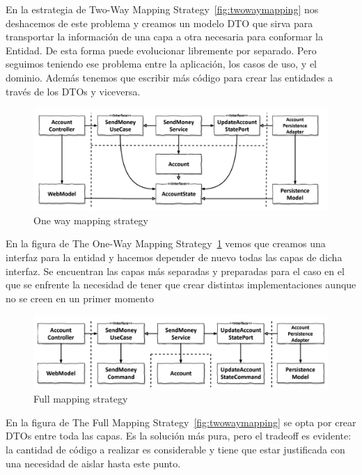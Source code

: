 En la estrategia de Two-Way Mapping Strategy~\cref{fig:twowaymapping} nos deshacemos de este problema y creamos un modelo DTO que sirva para transportar la información de una capa a otra necesaria para conformar la Entidad. De esta forma puede evolucionar libremente por separado. Pero seguimos teniendo ese problema entre la aplicación, los casos de uso, y el dominio. Además tenemos que escribir más código para crear las entidades a través de los DTOs y viceversa.

\begin{figure}[H]
    \centering
    \includegraphics[height=0.1\textheight]{./part/Ejecucion/Seguimiento/CreateTaskUseCase/img/onWaymapping}
    \caption{One way mapping strategy \cite{TomHombergs2019GYHD}}\label{fig:onWaymapping}
\end{figure}

En la figura de The One-Way Mapping Strategy~\cref{fig:onWaymapping} vemos que creamos una interfaz para la entidad y hacemos depender de nuevo todas las capas de dicha interfaz. Se encuentran las capas más separadas y preparadas para el caso en el que se enfrente la necesidad de tener que crear distintas implementaciones aunque no se creen en un primer momento

\begin{figure}[H]
    \centering
    \includegraphics[height=0.1\textheight]{./part/Ejecucion/Seguimiento/CreateTaskUseCase/img/fullmapping}
    \caption{Full mapping strategy \cite{TomHombergs2019GYHD}}\label{fig:fullmapping}
\end{figure}

En la figura de The Full Mapping Strategy~\cref{fig:twowaymapping} se opta por crear DTOs entre toda las capas. Es la solución más pura, pero el tradeoff es evidente: la cantidad de código a realizar es considerable y tiene que estar justificada con una necesidad de aislar hasta este punto.


